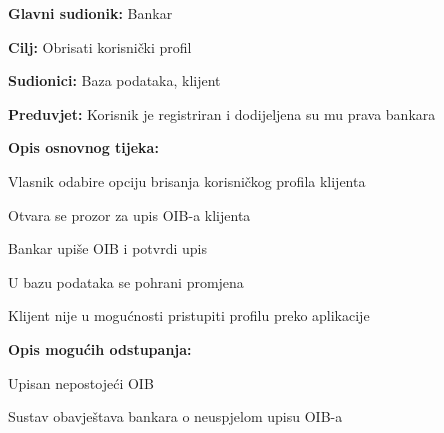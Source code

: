                 
                
                \noindent {}
                \begin{packed_item}
                
                  \item \textbf{Glavni sudionik: }Bankar
                  \item  \textbf{Cilj:} Obrisati korisnički profil 
                  \item  \textbf{Sudionici:} Baza podataka, klijent
                  \item  \textbf{Preduvjet:} Korisnik je registriran i dodijeljena su mu prava bankara 
                  \item  \textbf{Opis osnovnog tijeka:}
              
              \item[] \begin{packed_enum}
                
                    \item  Vlasnik odabire  opciju brisanja korisničkog profila klijenta
                    \item  Otvara se prozor za upis OIB-a klijenta
                    \item  Bankar  upiše OIB  i potvrdi upis
                    \item  U bazu podataka se pohrani promjena
                    \item  Klijent nije u mogućnosti pristupiti profilu preko aplikacije
                  \end{packed_enum}
                  
                  \item  \textbf{Opis mogućih odstupanja:}
                  
                  \item[] \begin{packed_enum}
                
                    \item[2.a] Upisan nepostojeći OIB
                    \item[] \begin{packed_enum}
                      
                      \item Sustav obavještava bankara o neuspjelom upisu OIB-a 
                
                    
                  \end{packed_enum}
                \end{packed_enum}
            \end{packed_item}
        
